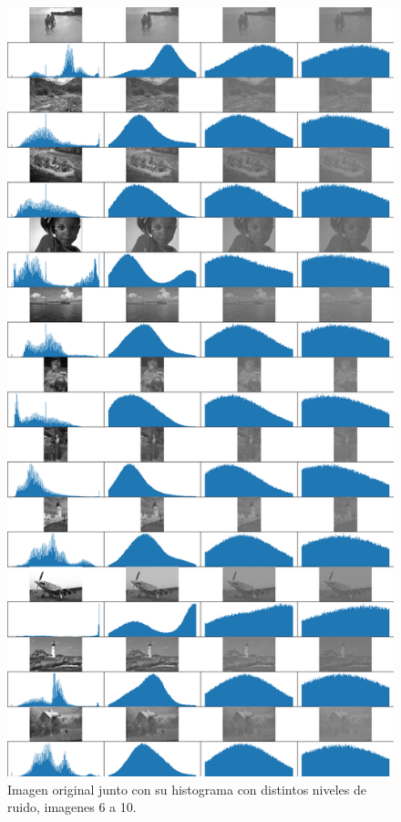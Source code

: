 \begin{figure}
    \centering
    \includegraphics[width=\textwidth]{figuras/img_hist_noise_2.png}
    \caption{Imagen original junto con su histograma con distintos niveles de ruido, imagenes 6 a 10.}
\end{figure}


